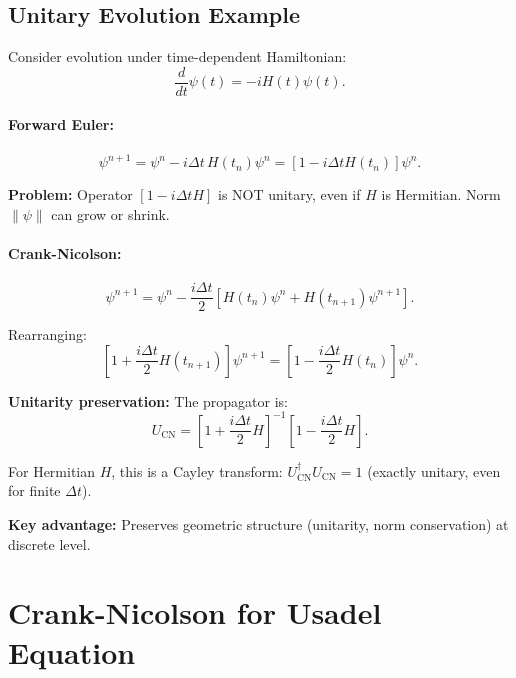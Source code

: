 \documentclass[11pt]{article}
\begin{document}
\subsection{Unitary Evolution Example}

Consider evolution under time-dependent Hamiltonian:
\begin{equation}
\frac{d}{dt} \psi(t) = -iH(t) \psi(t).
\end{equation}

\paragraph{Forward Euler:}
\begin{equation}
\psi^{n+1} = \psi^n - i\Delta t \, H(t_n) \psi^n = [1 - i\Delta t H(t_n)] \psi^n.
\end{equation}

\textbf{Problem:} Operator $[1 - i\Delta t H]$ is NOT unitary, even if $H$ is Hermitian. Norm $\|\psi\|$ can grow or shrink.

\paragraph{Crank-Nicolson:}
\begin{equation}
\psi^{n+1} = \psi^n - \frac{i\Delta t}{2} \left[ H(t_n) \psi^n + H(t_{n+1}) \psi^{n+1} \right].
\end{equation}

Rearranging:
\begin{equation}
\left[1 + \frac{i\Delta t}{2} H(t_{n+1})\right] \psi^{n+1} = \left[1 - \frac{i\Delta t}{2} H(t_n)\right] \psi^n.
\end{equation}

\textbf{Unitarity preservation:} The propagator is:
\begin{equation}
U_{\text{CN}} = \left[1 + \frac{i\Delta t}{2} H\right]^{-1} \left[1 - \frac{i\Delta t}{2} H\right].
\end{equation}

For Hermitian $H$, this is a Cayley transform: $U_{\text{CN}}^\dagger U_{\text{CN}} = 1$ (exactly unitary, even for finite $\Delta t$).

\textbf{Key advantage:} Preserves geometric structure (unitarity, norm conservation) at discrete level.

\section{Crank-Nicolson for Usadel Equation}
\end{document}
